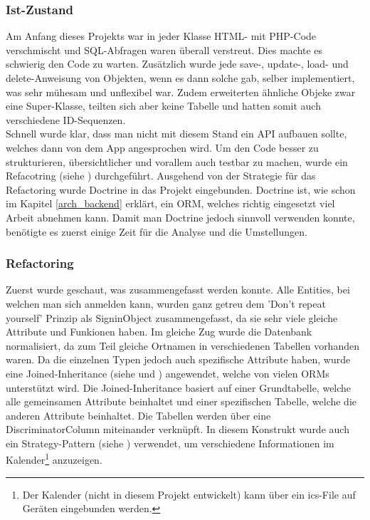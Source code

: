 \subsubsection{Ist-Zustand}
Am Anfang dieses Projekts war in jeder Klasse HTML- mit PHP-Code verschmischt und SQL-Abfragen waren überall verstreut. Dies machte es schwierig den Code zu warten. Zusätzlich wurde jede save-, update-, load- und delete-Anweisung von Objekten, wenn es dann solche gab, selber implementiert, was sehr mühesam und unflexibel war. Zudem erweiterten ähnliche Objeke zwar eine Super-Klasse, teilten sich aber keine Tabelle und hatten somit auch verschiedene ID-Sequenzen.\\

Schnell wurde klar, dass man nicht mit diesem Stand ein API aufbauen sollte, welches dann von dem App angesprochen wird. Um den Code besser zu strukturieren, übersichtlicher und vorallem auch testbar zu machen, wurde ein Refacotring (siehe \cite{feathers2004working}) durchgeführt. Ausgehend von der Strategie für das Refactoring wurde Doctrine in das Projekt eingebunden. Doctrine ist, wie schon im Kapitel \ref{arch_backend} erklärt, ein ORM, welches richtig eingesetzt viel Arbeit abnehmen kann. Damit man Doctrine jedoch sinnvoll verwenden konnte, benötigte es zuerst einige Zeit für die Analyse und die Umstellungen.

\subsubsection{Refactoring}
Zuerst wurde geschaut, was zusammengefasst werden konnte. Alle Entities, bei welchen man sich anmelden kann, wurden ganz getreu dem 'Don’t repeat yourself' Prinzip als SigninObject zusammengefasst, da sie sehr viele gleiche Attribute und Funkionen haben. Im gleiche Zug wurde die Datenbank normalisiert, da zum Teil gleiche Ortnamen in verschiedenen Tabellen vorhanden waren. Da die einzelnen Typen jedoch auch spezifische Attribute haben, wurde eine Joined-Inheritance (siehe \cite{inheritance_java} und \cite{inheritance_doctrine}) angewendet, welche von vielen ORMs unterstützt wird. Die Joined-Inheritance basiert auf einer Grundtabelle, welche alle gemeinsamen Attribute beinhaltet und einer spezifischen Tabelle, welche die anderen Attribute beinhaltet. Die Tabellen werden über eine DiscriminatorColumn miteinander verknüpft. In diesem Konstrukt wurde auch ein Strategy-Pattern (siehe \cite{gof_book}) verwendet, um verschiedene Informationen im Kalender\footnote{Der Kalender (nicht in diesem Projekt entwickelt) kann über ein ics-File auf Geräten eingebunden werden.} anzuzeigen.\\

